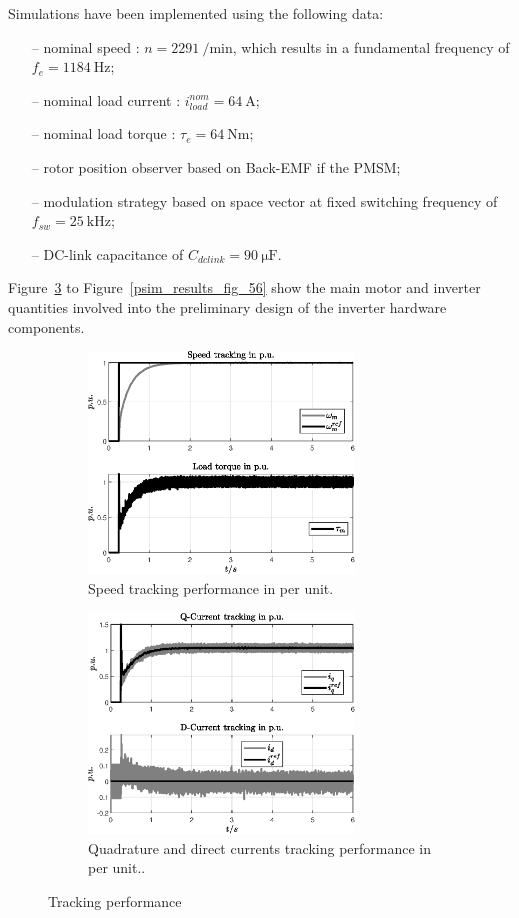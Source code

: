 \documentclass[11pt,a4paper,oneside]{book}
\numberwithin{equation}{section}
\theoremstyle{it}
\theoremstyle{definition}
\begin{document}
Simulations have been implemented using the following data:
\begin{itemize}
	\item[--] nominal speed : $n = \SI{2291}{\per\minute}$, which results in a fundamental frequency of $f_e = \SI{1184}{\hertz}$;
	\item[--] nominal load current : $i_{load}^{nom} = \SI{64}{\ampere}$;	
	\item[--] nominal load torque : $\tau_e = \SI{64}{\newton\meter}$;
	\item[--] rotor position observer based on Back-EMF if the PMSM;
	\item[--] modulation strategy based on space vector at fixed switching frequency of $f_{sw}=\SI{25}{\kilo\hertz}$;
	\item[--] DC-link capacitance of $C_{dclink}=\SI{90}{\micro\farad}$.
\end{itemize}
Figure~\ref{psim_results_fig_12} to Figure~\ref{psim_results_fig_56} show the main motor and inverter quantities involved into the preliminary design of the inverter hardware components.
\begin{figure}[H]
	\centering
	\begin{subfigure}{0.5\textwidth}
		\centering
		\includegraphics[width = 200pt, angle = 0, 
		keepaspectratio]{figures/preliminary_simulation_results/sim_results_preliminary_fig_1.eps}
		\captionsetup{width=0.65\textwidth, font=footnotesize}	
		\caption{Speed tracking performance in per unit.}
		\label{psim_results_fig_1}
	\end{subfigure}%
	\begin{subfigure}{.5\textwidth}
		\centering
		\includegraphics[width = 200pt, angle = 0, 
		keepaspectratio]{figures/preliminary_simulation_results/sim_results_preliminary_fig_2.eps}
		\captionsetup{width=0.65\textwidth, font=footnotesize}	
		\caption{Quadrature and direct currents tracking performance in per unit..}
		\label{psim_results_fig_2}
	\end{subfigure}
	\captionsetup{width=0.5\textwidth, font=small}	
	\caption{Tracking performance}
	\label{psim_results_fig_12}
\end{figure}
\end{document}
